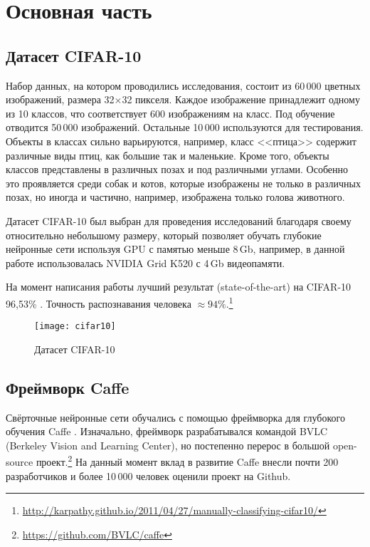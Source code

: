 \section{Основная часть}
\subsection{Датасет CIFAR-10}
Набор данных, на котором проводились исследования, состоит из 60\,000 цветных изображений, размера 
32$\times$32 пикселя. Каждое изображение принадлежит одному из 10 классов, что соответствует 600 изображениям на класс. Под 
обучение отводится 50\,000 изображений. Остальные 10\,000 используются для тестирования. Объекты в классах сильно варьируются, 
например, класс <<птица>> содержит различные виды птиц, как большие так и маленькие. Кроме того, объекты классов представлены в 
различных позах и под различными углами. Особенно это проявляется среди собак и котов, которые изображены не только в различных 
позах, но иногда и частично, например, изображена только голова животного.

Датасет CIFAR-10 \cite{learningmultiple} был выбран для проведения исследований благодаря своему относительно небольшому размеру, 
который позволяет обучать глубокие нейронные сети используя GPU с памятью меньше 8\,Gb, например, в данной работе использовалась 
NVIDIA Grid K520 с 4\,Gb видеопамяти.

На момент написания работы лучший результат (state-of-the-art) на CIFAR-10 96,53\% \cite{2014arXiv1412}. Точность  
распознавания человека $\approx94\%$.\footnote{\url{http://karpathy.github.io/2011/04/27/manually-classifying-cifar10/}}

\begin{figure}[h]
\centering
\texttt{[image: cifar10]}
\caption{Датасет CIFAR-10}
\end{figure}

\subsection{Фреймворк Caffe}
Свёрточные нейронные сети обучались с помощью фреймворка для глубокого обучения Caffe \cite{jia2014caffe}.
Изначально, фреймворк разрабатывался командой BVLC (Berkeley Vision and Learning Center), но постепенно перерос в большой 
open-source проект.\footnote{\url{https://github.com/BVLC/caffe}} На данный момент вклад в развитие Caffe внесли почти 200 
разработчиков и более 10\,000 человек оценили проект на Github.

